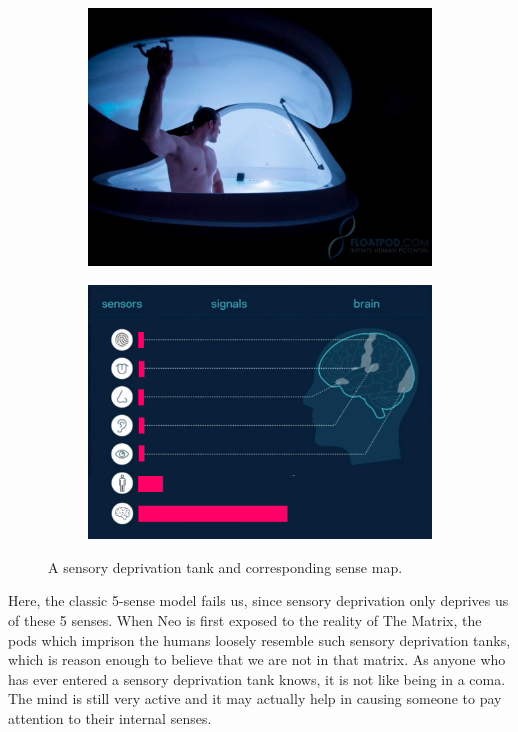 \documentclass{article}
\begin{document}
\begin{figure}[h!]
  \centering
  \begin{subfigure}[b]{0.48\linewidth}
    \includegraphics[width=\linewidth]{images/attention2-tank.jpg}
  \end{subfigure}
  \begin{subfigure}[b]{0.48\linewidth}
    \includegraphics[width=\linewidth]{images/ma-sensory-deprivation-tank.png}
  \end{subfigure}
  \caption{A sensory deprivation tank and corresponding sense map.}
  \label{fig:sensory-deprivation-tank}
\end{figure}

Here, the classic 5-sense model fails us, since sensory deprivation only deprives us of these 5 senses. When Neo is first exposed to the reality of The Matrix, the pods which imprison the humans loosely resemble such sensory deprivation tanks, which is reason enough to believe that we are not in that matrix. As anyone who has ever entered a sensory deprivation tank knows, it is not like being in a coma. The mind is still very active and it may actually help in causing someone to pay attention to their internal senses.
\end{document}
